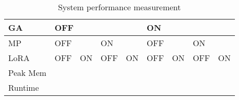 \begin{table}[h]
\centering
\begin{tabular}{l|llll|llll}
\hline
GA       & \multicolumn{4}{l|}{OFF}                                                           & \multicolumn{4}{l}{ON}                                                             \\ \hline
MP       & \multicolumn{2}{l|}{OFF}                           & \multicolumn{2}{l|}{ON}       & \multicolumn{2}{l|}{OFF}                           & \multicolumn{2}{l}{ON}        \\ \hline
LoRA     & \multicolumn{1}{l|}{OFF} & \multicolumn{1}{l|}{ON} & \multicolumn{1}{l|}{OFF} & ON & \multicolumn{1}{l|}{OFF} & \multicolumn{1}{l|}{ON} & \multicolumn{1}{l|}{OFF} & ON \\ \hline
Peak Mem & \multicolumn{1}{l|}{}    & \multicolumn{1}{l|}{}   & \multicolumn{1}{l|}{}    &    & \multicolumn{1}{l|}{}    & \multicolumn{1}{l|}{}   & \multicolumn{1}{l|}{}    &    \\ \hline
Runtime  & \multicolumn{1}{l|}{}    & \multicolumn{1}{l|}{}   & \multicolumn{1}{l|}{}    &    & \multicolumn{1}{l|}{}    & \multicolumn{1}{l|}{}   & \multicolumn{1}{l|}{}    &    \\ \hline
\end{tabular}
\caption{System performance measurement}
\label{tab:tab2}
\end{table}

